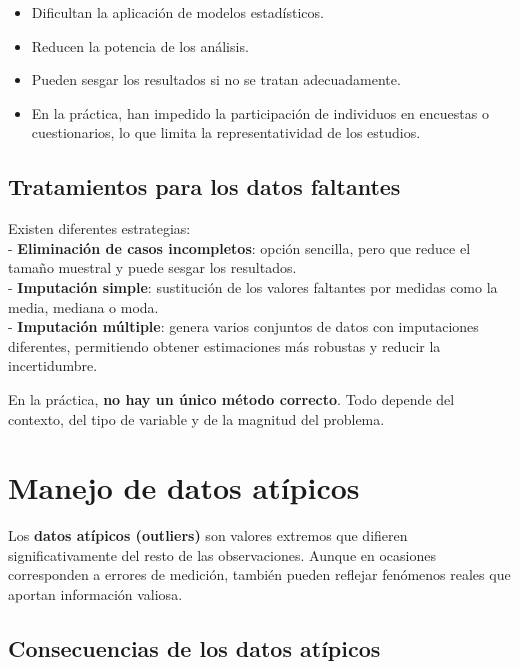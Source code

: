 \documentclass[
]{book}
\providecommand{\tightlist}{%
  \setlength{\itemsep}{0pt}\setlength{\parskip}{0pt}}
\begin{document}
\begin{itemize}
\tightlist
\item
  Dificultan la aplicación de modelos estadísticos.\\
\item
  Reducen la potencia de los análisis.\\
\item
  Pueden sesgar los resultados si no se tratan adecuadamente.\\
\item
  En la práctica, han impedido la participación de individuos en encuestas o cuestionarios, lo que limita la representatividad de los estudios.
\end{itemize}

\subsection{Tratamientos para los datos faltantes}\label{tratamientos-para-los-datos-faltantes}

Existen diferentes estrategias:\\
- \textbf{Eliminación de casos incompletos}: opción sencilla, pero que reduce el tamaño muestral y puede sesgar los resultados.\\
- \textbf{Imputación simple}: sustitución de los valores faltantes por medidas como la media, mediana o moda.\\
- \textbf{Imputación múltiple}: genera varios conjuntos de datos con imputaciones diferentes, permitiendo obtener estimaciones más robustas y reducir la incertidumbre.

En la práctica, \textbf{no hay un único método correcto}. Todo depende del contexto, del tipo de variable y de la magnitud del problema.

\section{Manejo de datos atípicos}\label{manejo-de-datos-atuxedpicos}

Los \textbf{datos atípicos (outliers)} son valores extremos que difieren significativamente del resto de las observaciones. Aunque en ocasiones corresponden a errores de medición, también pueden reflejar fenómenos reales que aportan información valiosa.

\subsection{Consecuencias de los datos atípicos}\label{consecuencias-de-los-datos-atuxedpicos}
\end{document}
